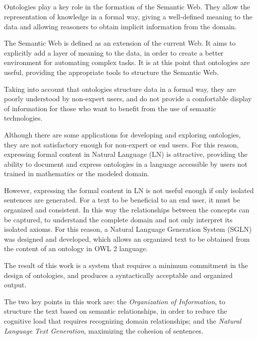 \ \\
\ \\
\label{pagsumm}
\\ \\
Ontologies play a key role in the formation of the Semantic Web. They allow the representation of knowledge in a formal way, giving a well-defined meaning to the data and allowing reasoners to obtain implicit information from the domain.

The Semantic Web is defined as an extension of the current Web. It aims to explicitly add a layer of meaning to the data, in order to create a better environment for automating complex tasks. It is at this point that ontologies are useful, providing the appropriate tools to structure the Semantic Web.

Taking into account that ontologies structure data in a formal way, they are poorly understood by non-expert users, and do not provide a comfortable display of information for those who want to benefit from the use of semantic technologies.

Although there are some applications for developing and exploring ontologies, they are not satisfactory enough for non-expert or end users.
For this reason, expressing formal content in Natural Language (LN) is attractive, providing the ability to document and express ontologies in a language accessible by users not trained in mathematics or the modeled domain.


However, expressing the formal content in LN is not useful enough if only isolated sentences are generated. For a text to be beneficial to an end user, it must be organized and consistent. In this way the relationships between the concepts can be captured, to understand the complete domain and not only interpret its isolated axioms. For this reason, a Natural Language Generation System (SGLN) was designed and developed, which allows an organized text to be obtained from the content of an ontology in OWL 2 language.


The result of this work is a system that requires a minimum commitment in the design of ontologies, and produces a syntactically acceptable and organized output.

The two key points in this work are: the \textit{Organization of Information}, to structure the text based on semantic relationships, in order to reduce the cognitive load that requires recognizing domain relationships; and the \textit{Natural Language Text Generation}, maximizing the cohesion of sentences.


\vfill
\pagebreak

